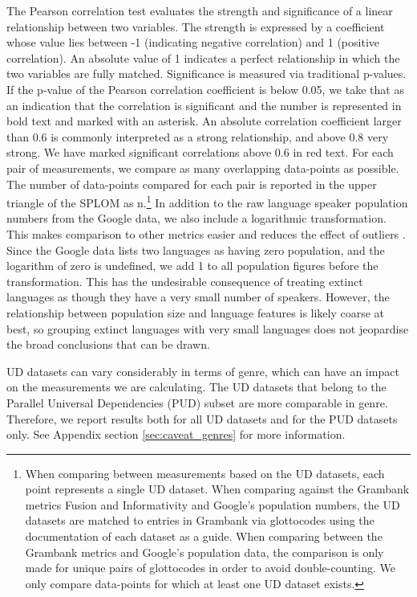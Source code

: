 \documentclass[USenglish]{article}
\begin{document}
The Pearson correlation test evaluates the strength and significance of a linear relationship between two variables. 
The strength is expressed by a coefficient whose value lies between -1 (indicating negative correlation) and 1 (positive correlation). 
An absolute value of 1 indicates a perfect relationship in which the two variables are fully matched. 
Significance is measured via traditional p-values.
If the p-value of the Pearson correlation coefficient is below 0.05, we take that as an indication that the correlation is significant and the number is represented in bold text and marked with an asterisk. 
An absolute correlation coefficient larger than 0.6 is commonly interpreted as a strong relationship, and above 0.8 very strong. 
We have marked significant correlations above 0.6 in red text.
For each pair of measurements, we compare as many overlapping data-points as possible.
The number of data-points compared for each pair is reported in the upper triangle of the SPLOM as n.\footnote{When comparing between measurements based on the UD datasets, each point represents a single UD dataset. When comparing against the Grambank metrics Fusion and Informativity and Google's population numbers, the UD datasets are matched to entries in Grambank via glottocodes \citep{glottolog5.0} using the documentation of each dataset as a guide. When comparing between the Grambank metrics and Google's population data, the comparison is only made for unique pairs of glottocodes in order to avoid double-counting. We only compare data-points for which at least one UD dataset exists.}
In addition to the raw language speaker population numbers from the Google data, we also include a logarithmic transformation.
This makes comparison to other metrics easier and reduces the effect of outliers \citep{changyong2014log}.
Since the Google data lists two languages as having zero population, and the logarithm of zero is undefined, we add 1 to all population figures before the transformation.
This has the undesirable consequence of treating extinct languages as though they have a very small number of speakers.
However, the relationship between population size and language features is likely coarse at best, so grouping extinct languages with very small languages does not jeopardise the broad conclusions that can be drawn.

UD datasets can vary considerably in terms of genre, which can have an impact on the measurements we are calculating. 
The UD datasets that belong to the Parallel Universal Dependencies (PUD) subset are more comparable in genre. 
Therefore, we report results both for all UD datasets and for the PUD datasets only. 
See Appendix section \ref{sec:caveat_genres} for more information.
\end{document}
